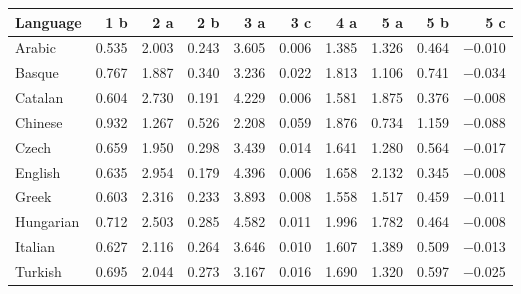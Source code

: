\begin{tabular}{lrrrrrrrrr}
\toprule
 Language   &   1 b &   2 a &   2 b &   3 a &   3 c &   4 a &   5 a &   5 b &    5 c \\
\midrule
 Arabic     & \num{0.535} & \num{2.003} & \num{0.243} & \num{3.605} & \num{0.006} & \num{1.385} & \num{1.326} & \num{0.464} & \num{-0.010} \\
 Basque     & \num{0.767} & \num{1.887} & \num{0.340} & \num{3.236} & \num{0.022} & \num{1.813} & \num{1.106} & \num{0.741} & \num{-0.034} \\
 Catalan    & \num{0.604} & \num{2.730} & \num{0.191} & \num{4.229} & \num{0.006} & \num{1.581} & \num{1.875} & \num{0.376} & \num{-0.008} \\
 Chinese    & \num{0.932} & \num{1.267} & \num{0.526} & \num{2.208} & \num{0.059} & \num{1.876} & \num{0.734} & \num{1.159} & \num{-0.088} \\
 Czech      & \num{0.659} & \num{1.950} & \num{0.298} & \num{3.439} & \num{0.014} & \num{1.641} & \num{1.280} & \num{0.564} & \num{-0.017} \\
 English    & \num{0.635} & \num{2.954} & \num{0.179} & \num{4.396} & \num{0.006} & \num{1.658} & \num{2.132} & \num{0.345} & \num{-0.008} \\
 Greek      & \num{0.603} & \num{2.316} & \num{0.233} & \num{3.893} & \num{0.008} & \num{1.558} & \num{1.517} & \num{0.459} & \num{-0.011} \\
 Hungarian  & \num{0.712} & \num{2.503} & \num{0.285} & \num{4.582} & \num{0.011} & \num{1.996} & \num{1.782} & \num{0.464} & \num{-0.008} \\
 Italian    & \num{0.627} & \num{2.116} & \num{0.264} & \num{3.646} & \num{0.010} & \num{1.607} & \num{1.389} & \num{0.509} & \num{-0.013} \\
 Turkish    & \num{0.695} & \num{2.044} & \num{0.273} & \num{3.167} & \num{0.016} & \num{1.690} & \num{1.320} & \num{0.597} & \num{-0.025} \\
\bottomrule
\end{tabular}